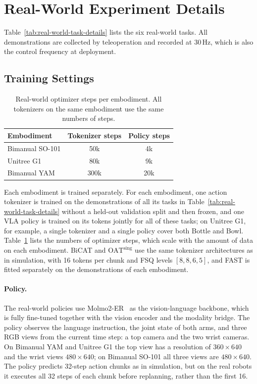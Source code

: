 \section{Real-World Experiment Details}
\label{app:real-world}


Table~\ref{tab:real-world-task-details} lists the six real-world tasks.
All demonstrations are collected by teleoperation and recorded at 30\,Hz,
which is also the control frequency at deployment.

\subsection{Training Settings}
\label{app:real-world-training}

\begin{table}[!ht]
    \centering
    \caption{Real-world optimizer steps per embodiment. All tokenizers on
    the same embodiment use the same numbers of steps.}
    \label{tab:real-world-training}
    \footnotesize
    \setlength{\tabcolsep}{6pt}
    \renewcommand{\arraystretch}{1.12}
    \begin{tabular}{@{}lcc@{}}
        \toprule
        Embodiment & Tokenizer steps & Policy steps \\
        \midrule
        Bimanual SO-101 & 50k  & 4k \\
        Unitree G1     & 80k  & 9k \\
        Bimanual YAM   & 300k & 20k \\
        \bottomrule
    \end{tabular}
\end{table}

Each embodiment is trained separately. For each embodiment, one action
tokenizer is trained on the demonstrations of all its tasks in
Table~\ref{tab:real-world-task-details} without a held-out validation
split and then frozen, and one VLA policy is trained on its
tokens jointly for all of these tasks; on Unitree G1, for example, a single
tokenizer and a single policy cover both Bottle and Bowl.
Table~\ref{tab:real-world-training} lists the numbers of optimizer steps,
which scale with the amount of data on each embodiment. BiCAT and
$\mathrm{OAT}^{\mathrm{sing}}$ use the same tokenizer architectures as in
simulation, with 16 tokens per chunk and FSQ levels $[8,8,6,5]$, and FAST is
fitted separately on the demonstrations of each embodiment.

\paragraph{Policy.}
The real-world policies use Molmo2-ER~\cite{fang2026molmoact2} as the
vision-language backbone, which is fully fine-tuned together with the
vision encoder and the modality bridge. The policy observes the language
instruction, the joint state of both arms, and three RGB views from the
current time step: a top camera and the two wrist cameras. On Bimanual YAM
and Unitree G1 the top view has a resolution of $360\times640$ and the
wrist views $480\times640$; on Bimanual SO-101 all three views are
$480\times640$. The policy predicts 32-step action chunks as in
simulation, but on the real robots it executes all 32 steps of each chunk
before replanning, rather than the first 16.

